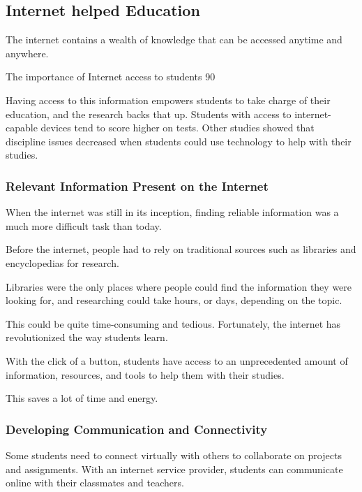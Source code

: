 \documentclass[a4paper,11pt]{article}
\begin{document}
\subsection{Internet helped Education}
The internet contains a wealth of knowledge that can be accessed anytime and anywhere. 

The importance of Internet access to students
90%

Having access to this information empowers students to take charge of their education, and the research backs that up. Students with access to internet-capable devices tend to score higher on tests. Other studies showed that discipline issues decreased when students could use technology to help with their studies. \cite{why-student-must-internet-access}

\subsubsection{Relevant Information Present on the Internet} \cite{internet-beneficial-students}
When the internet was still in its inception, finding reliable information was a much more difficult task than today.

Before the internet, people had to rely on traditional sources such as libraries and encyclopedias for research.

Libraries were the only places where people could find the information they were looking for, and researching could take hours, or days, depending on the topic.

This could be quite time-consuming and tedious. Fortunately, the internet has revolutionized the way students learn.

With the click of a button, students have access to an unprecedented amount of information, resources, and tools to help them with their studies.

This saves a lot of time and energy.
\subsubsection{Developing Communication and Connectivity}
Some students need to connect virtually with others to collaborate on projects and assignments. With an internet service provider, students can communicate online with their classmates and teachers.
\end{document}
